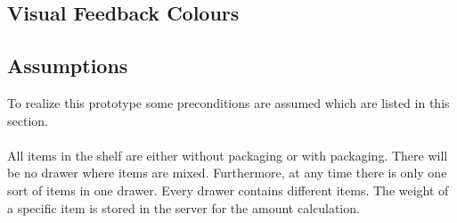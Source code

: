 \subsection{Visual Feedback Colours}


\subsection{Assumptions}
To realize this prototype some preconditions are assumed which are listed in this section. 
\\
\\
All items in the shelf are either without packaging or with packaging. 
There will be no drawer where items are mixed. 
Furthermore, at any time there is only one sort of items in one drawer. 
Every drawer contains different items. 
The weight of a specific item is stored in the server for the amount calculation. 